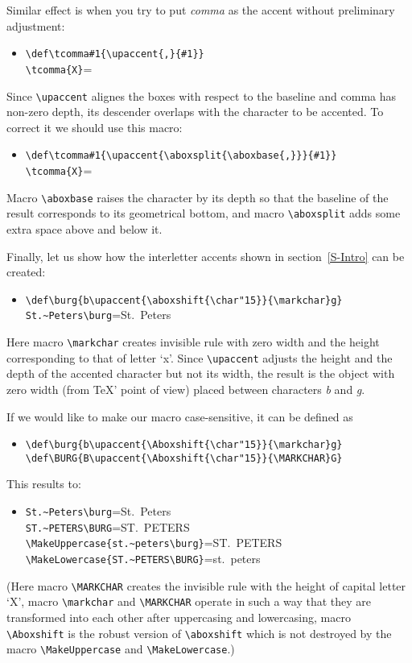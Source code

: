Similar effect is when you try to put \textit{comma} as the accent without
preliminary adjustment:
\begin{itemize}
\item[]
\verb?\def\tcomma#1{\upaccent{,}{#1}}?\\
\verb?\tcomma{X}?=
\end{itemize}
Since \verb?\upaccent? alignes the boxes with respect to the baseline
and comma has non-zero depth, its descender overlaps with the
character to be accented. To correct it we should use this macro:
\begin{itemize}
\item[]
\verb?\def\tcomma#1{\upaccent{\aboxsplit{\aboxbase{,}}}{#1}}?\\
\verb?\tcomma{X}?=
\end{itemize}
Macro \verb?\aboxbase? raises the character by its depth so that
the baseline of the result corresponds to its geometrical bottom, and
macro \verb?\aboxsplit? adds some extra space above and below it.

Finally, let us show how the interletter accents
shown in section~\ref{S-Intro} can be created:
\begin{itemize}
\item[]
\verb?\def\burg{b\upaccent{\aboxshift{\char"15}}{\markchar}g}?
\\
\verb?St.~Peters\burg?=St.~Peters\burg
\end{itemize}
Here macro \verb?\markchar? creates invisible rule with zero width and
the height corresponding to that of letter `x'. Since \verb?\upaccent?
adjusts the height and the depth of the accented character but not its
width, the result is the object with zero width (from \TeX' point of view)
placed between characters \textit{b} and \textit{g}.

If we would like
to make our macro case-sensitive, it can be defined as
\begin{itemize}
\item[]
\verb?\def\burg{b\upaccent{\Aboxshift{\char"15}}{\markchar}g}?
\\
\verb?\def\BURG{B\upaccent{\Aboxshift{\char"15}}{\MARKCHAR}G}?
\end{itemize}
This results to:
\begin{itemize}
\item[]
\verb?St.~Peters\burg?=St.~Peters\burg
\\
\verb?ST.~PETERS\BURG?=ST.~PETERS\BURG
\\
\verb?\MakeUppercase{st.~peters\burg}?=\MakeUppercase{st.~peters\burg}
\\
\verb?\MakeLowercase{ST.~PETERS\BURG}?=\MakeLowercase{ST.~PETERS\BURG}
\end{itemize}
(Here macro \verb?\MARKCHAR? creates the invisible rule
with the height of capital letter `X',
macro \verb?\markchar? and \verb?\MARKCHAR?
operate in such a way that they are transformed into each other
after uppercasing and lowercasing,
macro \verb?\Aboxshift? is the robust version of \verb?\aboxshift?
which is not destroyed by the \LaTeXe{} macro
\verb?\MakeUppercase? and \verb?\MakeLowercase?.)

